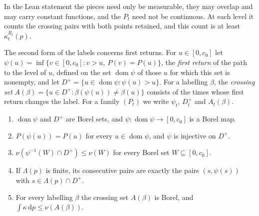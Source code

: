In the Lean statement the pieces need only be measurable, they may overlap and may carry constant functions, and the
$P_t$ need not be continuous. At each level it counts the crossing pairs with both points retained, and this count is at
least $\kappa_t^{R_t}(p)$.

The second form of the labels concerns first returns. For $u\in[0,c_0]$ let
$\psi(u)=\inf\{v\in[0,c_0]:v>u,\ P(v)=P(u)\}$, the \emph{first return} of the path to the level of $u$, defined on the
set $\operatorname{dom}\psi$ of those $u$ for which this set is nonempty, and let
$D^+=\{u\in\operatorname{dom}\psi:\psi(u)>u\}$. For a labelling $\beta$, the \emph{crossing set}
$A(\beta)=\{u\in D^+:\beta(\psi(u))\ne\beta(u)\}$ consists of the times whose first return changes the label. For a
family $(P_t)$ we write $\psi_t$, $D^+_t$ and $A_t(\beta)$.

\begin{lemma}[Returns]\label{lem:mot-returns}
\notformalized
\begin{enumerate}[label=(\alph*)]
\item $\operatorname{dom}\psi$ and $D^+$ are Borel sets, and $\psi\colon\operatorname{dom}\psi\to[0,c_0]$ is a Borel
map.
\item $P(\psi(u))=P(u)$ for every $u\in\operatorname{dom}\psi$, and $\psi$ is injective on $D^+$.
\item $\nu(\psi^{-1}(W)\cap D^+)\le\nu(W)$ for every Borel set $W\subseteq[0,c_0]$.
\item If $\Lambda(p)$ is finite, its consecutive pairs are exactly the pairs $(s,\psi(s))$ with $s\in\Lambda(p)\cap D^+$.
\item For every labelling $\beta$ the crossing set $A(\beta)$ is Borel, and $\int\kappa\,\mathrm dp\le\nu(A(\beta))$.
\end{enumerate}
\end{lemma}

